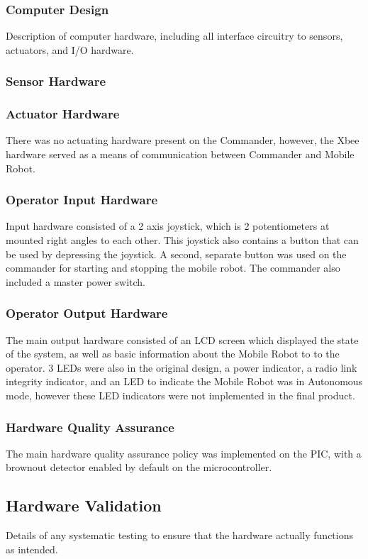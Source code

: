 \documentclass[11pt,a4paper]{article}
\begin{document}
    \subsubsection{Computer Design}
      Description of computer hardware, including all interface circuitry to sensors, actuators, and I/O hardware.
    \subsubsection{Sensor Hardware}
    \subsubsection{Actuator Hardware}
      There was no actuating hardware present on the Commander, however, the Xbee hardware served as a means of communication between Commander and Mobile Robot.
    \subsubsection{Operator Input Hardware}
      Input hardware consisted of a 2 axis joystick, which is 2 potentiometers at mounted right angles to each other. This joystick also contains a button that can be used by depressing the joystick. A second, separate button was used on the commander for starting and stopping the mobile robot. The commander also included a master power switch.
    \subsubsection{Operator Output Hardware}
      The main output hardware consisted of an LCD screen which displayed the state of the system, as well as basic information about the Mobile Robot to to the operator. 3 LEDs were also in the original design, a power indicator, a radio link integrity indicator, and an LED to indicate the Mobile Robot was in Autonomous mode, however these LED indicators were not implemented in the final product.
    \subsubsection{Hardware Quality Assurance}
      The main hardware quality assurance policy was implemented on the PIC, with a brownout detector enabled by default on the microcontroller.\\

  \subsection{Hardware Validation}
  Details of any systematic testing to ensure that the hardware actually functions as intended.
\end{document}
